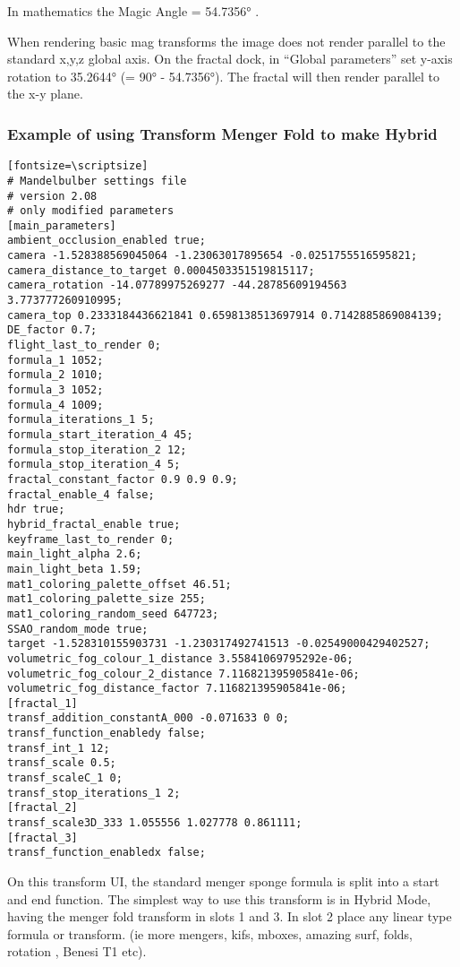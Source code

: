 In mathematics the Magic Angle = 54.7356° .

When rendering basic mag transforms the image does not render parallel to the
standard x,y,z global axis. On the fractal dock, in ``Global parameters'' set
y-axis rotation to 35.2644° (= 90° - 54.7356°). The fractal will then render
parallel to the x-y plane.

\subsubsection{Example of using Transform Menger Fold to make
	Hybrid}\label{example-of-using-transfrom-mengerfold}

\begin{verbatim}[fontsize=\scriptsize]
# Mandelbulber settings file
# version 2.08
# only modified parameters
[main_parameters]
ambient_occlusion_enabled true;
camera -1.528388569045064 -1.23063017895654 -0.0251755516595821;
camera_distance_to_target 0.0004503351519815117;
camera_rotation -14.07789975269277 -44.28785609194563 3.773777260910995;
camera_top 0.2333184436621841 0.6598138513697914 0.7142885869084139;
DE_factor 0.7;
flight_last_to_render 0;
formula_1 1052;
formula_2 1010;
formula_3 1052;
formula_4 1009;
formula_iterations_1 5;
formula_start_iteration_4 45;
formula_stop_iteration_2 12;
formula_stop_iteration_4 5;
fractal_constant_factor 0.9 0.9 0.9;
fractal_enable_4 false;
hdr true;
hybrid_fractal_enable true;
keyframe_last_to_render 0;
main_light_alpha 2.6;
main_light_beta 1.59;
mat1_coloring_palette_offset 46.51;
mat1_coloring_palette_size 255;
mat1_coloring_random_seed 647723;
SSAO_random_mode true;
target -1.528310155903731 -1.230317492741513 -0.02549000429402527;
volumetric_fog_colour_1_distance 3.55841069795292e-06;
volumetric_fog_colour_2_distance 7.116821395905841e-06;
volumetric_fog_distance_factor 7.116821395905841e-06;
[fractal_1]
transf_addition_constantA_000 -0.071633 0 0;
transf_function_enabledy false;
transf_int_1 12;
transf_scale 0.5;
transf_scaleC_1 0;
transf_stop_iterations_1 2;
[fractal_2]
transf_scale3D_333 1.055556 1.027778 0.861111;
[fractal_3]
transf_function_enabledx false;
\end{verbatim}

On this transform UI, the standard menger sponge formula is split into a start
and end function. The simplest way to use this transform is in Hybrid Mode,
having the menger fold transform in slots 1 and 3. In slot 2 place any linear
type formula or transform. (ie more mengers, kifs, mboxes, amazing surf, folds,
rotation , Benesi T1 etc).

